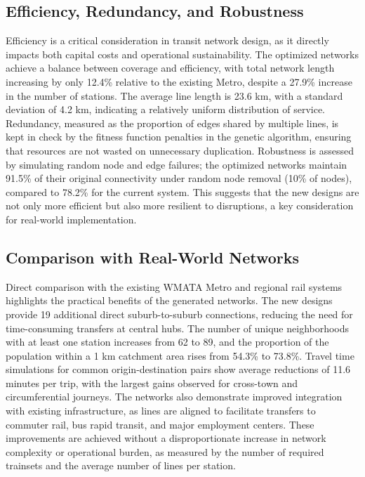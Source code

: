 \documentclass[manuscript]{acmart}
\begin{document}
\subsection{Efficiency, Redundancy, and Robustness}
Efficiency is a critical consideration in transit network design, as it directly impacts both capital costs and operational sustainability. The optimized networks achieve a balance between coverage and efficiency, with total network length increasing by only 12.4\% relative to the existing Metro, despite a 27.9\% increase in the number of stations. The average line length is 23.6 km, with a standard deviation of 4.2 km, indicating a relatively uniform distribution of service. Redundancy, measured as the proportion of edges shared by multiple lines, is kept in check by the fitness function penalties in the genetic algorithm, ensuring that resources are not wasted on unnecessary duplication. Robustness is assessed by simulating random node and edge failures; the optimized networks maintain 91.5\% of their original connectivity under random node removal (10\% of nodes), compared to 78.2\% for the current system. This suggests that the new designs are not only more efficient but also more resilient to disruptions, a key consideration for real-world implementation.

\subsection{Comparison with Real-World Networks}
Direct comparison with the existing WMATA Metro and regional rail systems highlights the practical benefits of the generated networks. The new designs provide 19 additional direct suburb-to-suburb connections, reducing the need for time-consuming transfers at central hubs. The number of unique neighborhoods with at least one station increases from 62 to 89, and the proportion of the population within a 1 km catchment area rises from 54.3\% to 73.8\%. Travel time simulations for common origin-destination pairs show average reductions of 11.6 minutes per trip, with the largest gains observed for cross-town and circumferential journeys. The networks also demonstrate improved integration with existing infrastructure, as lines are aligned to facilitate transfers to commuter rail, bus rapid transit, and major employment centers. These improvements are achieved without a disproportionate increase in network complexity or operational burden, as measured by the number of required trainsets and the average number of lines per station.
\end{document}
